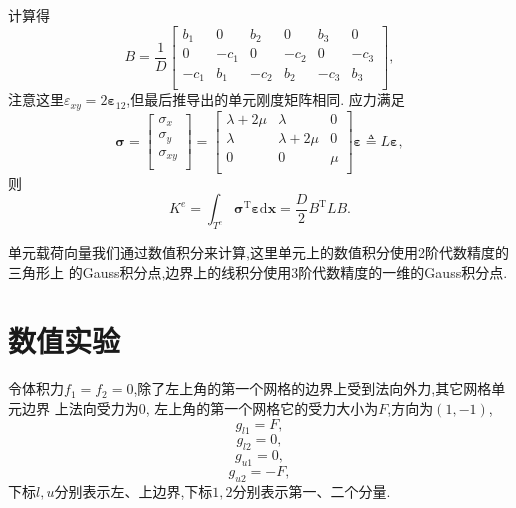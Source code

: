 \documentclass[a4paper, 11pt]{ctexart}
\newcommand\bx{\boldsymbol{x}}
\newcommand\dd{\mathrm{d}}
\newcommand\beps{\bm{\varepsilon}}
\newcommand\bsig{\bm{\sigma}}
\begin{document}
计算得
\begin{equation}
  B=
  \dfrac{1}{D}
  \begin{bmatrix}
    b_1 & 0 & b_2 & 0 & b_3 & 0 \\
    0 & -c_1 & 0 & -c_2 & 0 & -c_3 \\
    -c_1 & b_1 & -c_2 & b_2 & -c_3 & b_3 \\
  \end{bmatrix},
\end{equation}
注意这里$\varepsilon_{xy}=2\beps_{12}$,但最后推导出的单元刚度矩阵相同.
应力满足
\begin{equation}
  \bsig=\begin{bmatrix}
    {\sigma_x} \\
    {\sigma_y} \\
    \sigma_{xy}\\
    \end{bmatrix}
    =
    \begin{bmatrix}
      \lambda+2\mu & \lambda & 0 \\
      \lambda & \lambda+2\mu & 0 \\
      0 & 0 & \mu \\
    \end{bmatrix}
    \beps
    \triangleq L\beps,
\end{equation}
则
\begin{equation}
  K^e=\int_{T^e}\bsig^{\mathrm{T}}\beps\dd\bx=\dfrac{D}{2}B^\mathrm{T}LB.
\end{equation}

单元载荷向量我们通过数值积分来计算,这里单元上的数值积分使用2阶代数精度的三角形上
的Gauss积分点,边界上的线积分使用3阶代数精度的一维的Gauss积分点.

\section{数值实验}
令体积力$f_1=f_2=0$,除了左上角的第一个网格的边界上受到法向外力,其它网格单元边界
上法向受力为$0$,
左上角的第一个网格它的受力大小为$F$,方向为$(1,-1)$,
$$g_{l1}=F,$$
$$g_{l2}=0,$$
$$g_{u1}=0,$$
$$g_{u2}=-F,$$
下标$l,u$分别表示左、上边界,下标$1,2$分别表示第一、二个分量.
\end{document}
